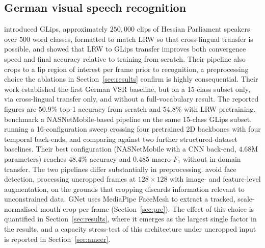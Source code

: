 \documentclass[10pt, a4paper]{article}
\begin{document}
\subsection{German visual speech recognition}
\noindent \citet{schwiebert2022glips} introduced GLips, approximately $250{,}000$ clips of Hessian Parliament speakers over $500$ word classes, formatted to match LRW so that cross-lingual transfer is possible, and showed that LRW to GLips transfer improves both convergence speed and final accuracy relative to training from scratch. Their pipeline also crops to a lip region of interest per frame prior to recognition, a preprocessing choice the ablations in Section~\ref{sec:results} confirm is highly consequential. Their work established the first German VSR baseline, but on a 15-class subset only, via cross-lingual transfer only, and without a full-vocabulary result. The reported figures are $50.9\%$ top-1 accuracy from scratch and $54.8\%$ with LRW pretraining.
\noindent \citet{ameer2024} benchmark a NASNetMobile-based pipeline on the same 15-class GLips subset, running a 16-configuration sweep crossing four pretrained 2D backbones with four temporal back-ends, and comparing against two further structured-dataset baselines. Their best configuration (NASNetMobile with a CNN back-end, $4.68$M parameters) reaches $48.4\%$ accuracy and $0.485$ macro-$F_1$ without in-domain transfer.
\noindent The two pipelines differ substantially in preprocessing. \citet{ameer2024} avoid face detection, processing uncropped frames at $128\times128$ with image- and feature-level augmentation, on the grounds that cropping discards information relevant to unconstrained data. GNet uses MediaPipe FaceMesh \citep{lugaresi2019mediapipe} to extract a tracked, scale-normalised mouth crop per frame (Section~\ref{sec:pre}). The effect of this choice is quantified in Section~\ref{sec:results}, where it emerges as the largest single factor in the results, and a capacity stress-test of this architecture under uncropped input is reported in Section~\ref{sec:ameer}.
\end{document}
